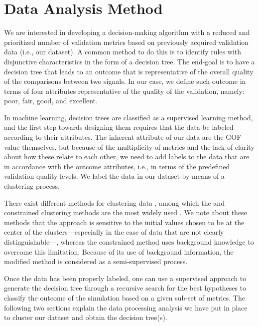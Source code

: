 
\section{Data Analysis Method} 
\label{sec:approach}

We are interested in developing a decision-making algorithm with a reduced and prioritized number of validation metrics based on previously acquired validation data (i.e., our dataset). A common method to do this is to identify rules with disjunctive characteristics in the form of a decision tree. The end-goal is to have a decision tree that leads to an outcome that is representative of the overall quality of the comparisons between two signals. In our case, we define such outcome in terms of four attributes representative of the quality of the validation, namely: poor, fair, good, and excellent.

In machine learning, decision trees are classified as a supervised learning method, and the first step towards designing them requires that the data be labeled according to their attributes. The inherent attribute of our data are the GOF value themselves, but because of the multiplicity of metrics and the lack of clarity about how these relate to each other, we need to add labels to the data that are in accordance with the outcome attributes, i.e., in terms of the predefined validation quality levels. We label the data in our dataset by means of a clustering process. 

There exist different methods for clustering data \citep[see Chapters 10 and 11 in][]{Han_2011_Book}, among which the \kmeans{} and constrained \kmeans{} clustering methods are the most widely used \citep{Jain_1999_ACMCS}. We note about these methods that the \kmeans{} approach is sensitive to the initial values chosen to be at the center of the clusters---especially in the case of data that are not clearly distinguishable---, whereas the constrained \kmeans{} method uses background knowledge to overcome this limitation. Because of its use of background information, the modified \kmeans{} method is considered as a semi-supervised process.

Once the data has been properly labeled, one can use a supervised approach to generate the decision tree through a recursive search for the best hypotheses to classify the outcome of the simulation based on a given sub-set of metrics. The following two sections explain the data processing analysis we have put in place to cluster our dataset and obtain the decision tree(s).

